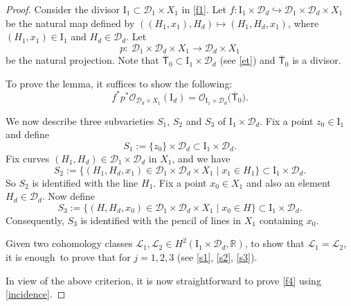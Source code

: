 \begin{proof}
Consider the divisor $\mathrm{I}_1  \subset \mathcal{D}_1\times X_1$ in \eqref{f1}.
Let
$
f \colon  \mathrm{I}_1\times \mathcal{D}_d  \hookrightarrow  \mathcal{D}_1 \times \mathcal{D}_d \times X_1$
be the natural map defined by $((H_1, x_1), H_d) \longmapsto (H_1, H_d, x_1)$, where
$(H_1, x_1) \in \mathrm{I}_1$ and $H_d \in \mathcal{D}_d$. Let
\begin{equation}\label{f3}
p \colon\ \mathcal{D}_1 \times \mathcal{D}_d \times X_1 \longrightarrow
\mathcal{D}_d \times X_1
\end{equation}
be the natural projection. Note that
$
\overline{\mathsf{T}}_0 \subset \mathrm{I}_1\times \mathcal{D}_d
$
(see \eqref{et}) and $\overline{\mathsf{T}}_0$ is a divisor.

To prove the lemma, it suffices to show the following:
\begin{equation}\label{f4}
f^*p^* {\mathcal O}_{\mathcal{D}_d \times X_1}(\mathrm{I}_d) =
{\mathcal O}_{\mathrm{I}_1\times \mathcal{D}_d}\bigl(\overline{\mathsf{T}}_0\bigr).
\end{equation}

We now describe three subvarieties $S_1$, $S_2$ and $S_3$ of $\mathrm{I}_1\times \mathcal{D}_d$. Fix
a point $z_0 \in \mathrm{I}_1$ and define%
\begin{equation}\label{s1}
S_1 := \{z_0\}\times\mathcal{D}_d \subset \mathrm{I}_1\times \mathcal{D}_d.
\end{equation}
Fix curves $(H_1, H_d) \in \mathcal{D}_1 \times \mathcal{D}_d$ in $X_1$, and we have
\begin{equation}\label{s2}
S_2 := \{(H_1, H_d, x_1) \in \mathcal{D}_1 \times \mathcal{D}_d \times X_1
  \mid  x_1 \in H_1\} \subset \mathrm{I}_1\times \mathcal{D}_d.
\end{equation}
So $S_2$ is identified with the line $H_1$. Fix a point $x_0 \in X_1$ and also an
element $H_d \in \mathcal{D}_d$. Now define
\begin{equation}\label{s3}
S_3 := \{(H, H_d, x_0) \in \mathcal{D}_1 \times \mathcal{D}_d \times X_1  \mid
x_0 \in H\} \subset \mathrm{I}_1\times \mathcal{D}_d.
\end{equation}
Consequently, $S_3$ is identified with the pencil of lines in $X_1$ containing $x_0$.

Given two cohomology classes ${\mathcal L}_1, {\mathcal L}_2  \in H^2(\mathrm{I}_1\times \mathcal{D}_d,
{\mathbb R})$, to show that
${\mathcal L}_1 = {\mathcal L}_2$, it is enough~to prove that
for $j = 1, 2, 3$ (see \eqref{s1}, \eqref{s2}, \eqref{s3}).

In view of the above criterion, it is now straightforward to prove \eqref{f4} using \eqref{incidence}.
\end{proof}

